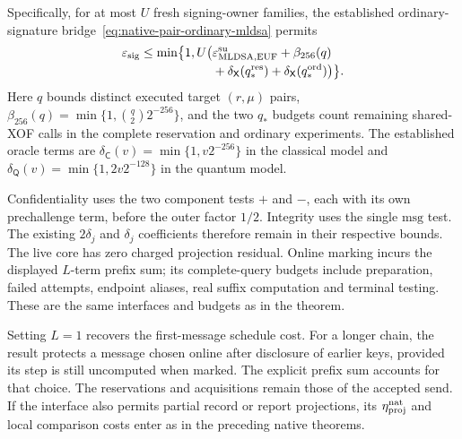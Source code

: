 Specifically, for at most $U$ fresh signing-owner families, the established
ordinary-signature bridge~\eqref{eq:native-pair-ordinary-mldsa} permits
\[
\begin{split}
 \varepsilon_{\rm sig}\le\min\bigl\{1,U\bigl(&
 \varepsilon_{\rm MLDSA,EUF}^{\rm su}+\beta_{256}(q)\\[-2pt]
 &+\delta_{\mathsf X}(q_*^{\rm res})
  +\delta_{\mathsf X}(q_*^{\rm ord})\bigr)\bigr\}.
\end{split}
\]
Here $q$ bounds distinct executed target $(r,\mu)$ pairs,
$\beta_{256}(q)=\min\{1,\binom q2 2^{-256}\}$, and the two $q_*$ budgets
count remaining shared-XOF calls in the complete reservation and ordinary
experiments. The established oracle terms are
$\delta_{\mathsf C}(v)=\min\{1,v2^{-256}\}$ in the classical model and
$\delta_{\mathsf Q}(v)=\min\{1,2v2^{-128}\}$ in the quantum model.

Confidentiality uses the two component tests $+$ and $-$, each with its
own prechallenge term, before the outer factor $1/2$. Integrity uses the
single $\mathrm{msg}$ test. The existing $2\delta_j$ and $\delta_j$
coefficients therefore remain in their respective bounds. The live core
has zero charged projection residual. Online marking incurs the displayed
$L$-term prefix sum; its complete-query budgets include preparation,
failed attempts, endpoint aliases, real suffix computation and terminal
testing. These are the same interfaces and budgets as in the theorem.

Setting $L=1$ recovers the first-message schedule cost. For a longer
chain, the result protects a message chosen online after disclosure of
earlier keys, provided its step is still uncomputed when marked. The
explicit prefix sum accounts for that choice. The reservations and
acquisitions remain those of the accepted send.
If the interface also permits partial record or report projections,
its $\eta_{\rm proj}^{\rm nat}$ and local comparison costs enter as
in the preceding native theorems.
